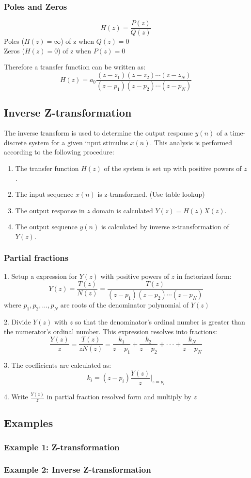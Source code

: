 \subsubsection{Poles and Zeros}
$$H(z)=\frac{P(z)}{Q(z)}$$
Poles ($H(z)=\infty$) of z when $Q(z)=0$\\
Zeros ($H(z)=0$) of z when $P(z)=0$

Therefore a transfer function can be written as:
$$H(z)=a_0\frac{(z-z_1)(z-z_2)\cdots(z-z_N)}{(z-p_1)(z-p_2)\cdots(z-p_N)}$$

\subsection{Inverse Z-transformation}
The inverse transform is used to determine the output response $y(n)$ of a time-discrete system for a given input stimulus $x(n)$. This analysis is performed according to the following procedure:
\begin{enumerate}
  \item The transfer function $H(z)$ of the system is set up with positive powers of $z$.
  \item The input sequence $x(n)$ is z-transformed. (Use table lookup)
  \item The output response in $z$ domain is calculated $Y(z)=H(z)X(z)$.
  \item The output sequence $y(n)$ is calculated by inverse z-transformation of $Y(z)$.
\end{enumerate}

\subsubsection{Partial fractions}
1. Setup a expression for $Y(z)$ with positive powers of $z$ in factorized form:
$$Y(z)=\frac{T(z)}{N(z)}=\frac{T(z)}{(z-p_1)(z-p_2)\cdots(z-p_N)}$$
where $p_1,p_2,\dots,p_N$ are roots of the denominator polynomial of $Y(z)$

2. Divide $Y(z)$ with $z$ so that the denominator's ordinal number is greater than the numerator's ordinal number. This expression resolves into fractions:
$$\frac{Y(z)}{z}=\frac{T(z)}{z N(z)}=\frac{k_{1}}{z-p_{1}}+\frac{k_{2}}{z-p_{2}}+\cdot\cdot\cdot+\frac{k_{N}}{z-p_{N}}$$

3. The coefficients are calculated as:
$$k_{i}=(z-p_{i})\frac{Y(z)}{z}\vert_{z=p_{i}}$$

4. Write $\frac{Y(z)}{z}$ in partial fraction resolved form and multiply by $z$
\subsection{Examples}
\subsubsection{Example 1: Z-transformation}
\subsubsection{Example 2: Inverse Z-transformation}
